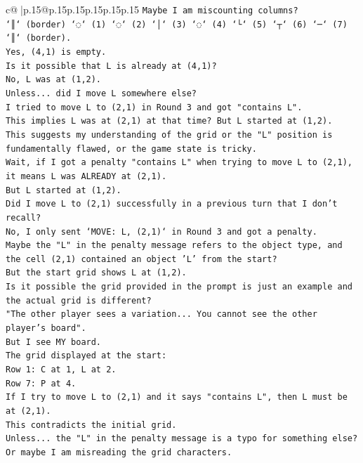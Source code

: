 \documentclass{article}
\begin{document}
{\begin{supertabular}{c@{$\;$}|p{.15\linewidth}@{}p{.15\linewidth}p{.15\linewidth}p{.15\linewidth}p{.15\linewidth}p{.15\linewidth}}
{{{\texttt{Maybe I am miscounting columns?} \\
\texttt{`║` (border) `◌` (1) `◌` (2) `│` (3) `◌` (4) `└` (5) `┬` (6) `─` (7) `║` (border).} \\
\texttt{Yes, (4,1) is empty.} \\
\texttt{Is it possible that L is already at (4,1)?} \\
\texttt{No, L was at (1,2).} \\
\texttt{Unless... did I move L somewhere else?} \\
\texttt{I tried to move L to (2,1) in Round 3 and got "contains L".} \\
\texttt{This implies L was at (2,1) at that time? But L started at (1,2).} \\
\texttt{This suggests my understanding of the grid or the "L" position is fundamentally flawed, or the game state is tricky.} \\
\texttt{Wait, if I got a penalty "contains L" when trying to move L to (2,1), it means L was ALREADY at (2,1).} \\
\texttt{But L started at (1,2).} \\
\texttt{Did I move L to (2,1) successfully in a previous turn that I don't recall?} \\
\texttt{No, I only sent `MOVE: L, (2,1)` in Round 3 and got a penalty.} \\
\texttt{Maybe the "L" in the penalty message refers to the object type, and the cell (2,1) contained an object 'L' from the start?} \\
\texttt{But the start grid shows L at (1,2).} \\
\texttt{Is it possible the grid provided in the prompt is just an example and the actual grid is different?} \\
\texttt{"The other player sees a variation... You cannot see the other player's board".} \\
\texttt{But I see MY board.} \\
\texttt{The grid displayed at the start:} \\
\texttt{Row 1: C at 1, L at 2.} \\
\texttt{Row 7: P at 4.} \\
\texttt{If I try to move L to (2,1) and it says "contains L", then L must be at (2,1).} \\
\texttt{This contradicts the initial grid.} \\
\texttt{Unless... the "L" in the penalty message is a typo for something else? Or maybe I am misreading the grid characters.} \\
}}}
\end{supertabular}}
\end{document}
